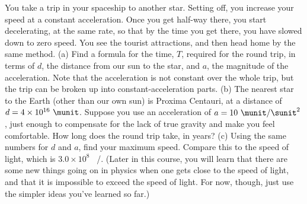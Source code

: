You take a trip in your spaceship to another star.
Setting off, you increase your speed at a constant
acceleration. Once you get half-way there, you start
decelerating, at the same rate, so that by the time you get
there, you have slowed down to zero speed. You see the
tourist attractions, and then head home by the same method.\hwendpart
(a) Find a formula for the time, $T$, required for the round
trip, in terms of $d$, the distance from our sun to the
star, and $a$, the magnitude of the acceleration. Note that
the acceleration is not constant over the whole trip, but
the trip can be broken up into constant-acceleration parts.\hwendpart
(b) The nearest star to the Earth (other than our own sun)
is Proxima Centauri, at a distance of $d=4\times10^{16}\ \munit$.
Suppose you use an acceleration of $a=10\ \munit/\sunit^2$, just enough
to compensate for the lack of true gravity and make you feel
comfortable. How long does the round trip take, in years?\hwendpart
(c) Using the same numbers for $d$ and $a$, find your
maximum speed. Compare this to the speed of light, which is
$3.0\times10^8$  \ \munit/\sunit. (Later in this course, you will learn
that there are some new things going on in physics when one
gets close to the speed of light, and that it is impossible
to exceed the speed of light. For now, though, just use the
simpler ideas you've learned so far.) \answercheck
